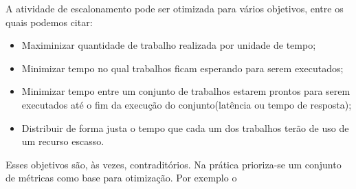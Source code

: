 A atividade de escalonamento pode ser otimizada para vários objetivos, entre os quais podemos citar:
\begin{itemize}
	\item Maximinizar quantidade de trabalho realizada por unidade de tempo;
	\item Minimizar tempo no qual trabalhos ficam esperando para serem executados;
	\item Minimizar tempo entre um conjunto de trabalhos estarem prontos para serem executados até o fim da execução do conjunto(latência ou tempo de resposta);
	\item Distribuir de forma justa o tempo que cada um dos trabalhos terão de uso de um recurso escasso.
\end{itemize}

Esses objetivos são, às vezes, contraditórios. Na prática prioriza-se um conjunto de métricas como base para otimização. Por exemplo o 